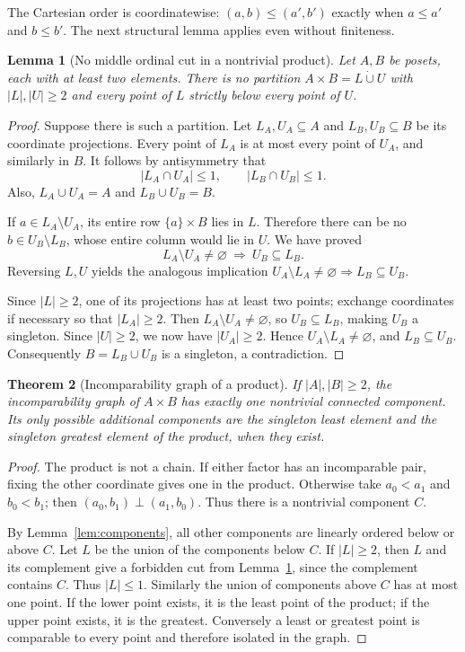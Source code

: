 \documentclass[11pt,a4paper]{article}
\newtheorem{theorem}{Theorem}[section]
\newtheorem{lemma}[theorem]{Lemma}
\theoremstyle{definition}
\theoremstyle{remark}
\begin{document}
The Cartesian order is coordinatewise:
$(a,b)\le(a',b')$ exactly when $a\le a'$ and $b\le b'$.
The next structural lemma applies even without finiteness.

\begin{lemma}[No middle ordinal cut in a nontrivial product]\label{lem:cut}
Let $A,B$ be posets, each with at least two elements. There is no partition
$A\times B=L\mathbin{\dot\cup}U$ with $|L|,|U|\ge2$ and every point of $L$
strictly below every point of $U$.
\end{lemma}

\begin{proof}
Suppose there is such a partition. Let
$L_A,U_A\subseteq A$ and $L_B,U_B\subseteq B$ be its coordinate projections.
Every point of $L_A$ is at most every point of $U_A$, and similarly in $B$.
It follows by antisymmetry that
\[
 |L_A\cap U_A|\le1,\qquad |L_B\cap U_B|\le1.
\]
Also, $L_A\cup U_A=A$ and $L_B\cup U_B=B$.

If $a\in L_A\setminus U_A$, its entire row $\{a\}\times B$ lies in $L$.
Therefore there can be no $b\in U_B\setminus L_B$, whose entire column
would lie in $U$. We have proved
\[
 L_A\setminus U_A\ne\varnothing\ \Longrightarrow\ U_B\subseteq L_B.
\]
Reversing $L,U$ yields the analogous implication
$U_A\setminus L_A\ne\varnothing\Rightarrow L_B\subseteq U_B$.

Since $|L|\ge2$, one of its projections has at least two points; exchange
coordinates if necessary so that $|L_A|\ge2$. Then
$L_A\setminus U_A\ne\varnothing$, so $U_B\subseteq L_B$, making $U_B$ a
singleton. Since $|U|\ge2$, we now have $|U_A|\ge2$. Hence
$U_A\setminus L_A\ne\varnothing$, and $L_B\subseteq U_B$. Consequently
$B=L_B\cup U_B$ is a singleton, a contradiction.
\end{proof}

\begin{theorem}[Incomparability graph of a product]\label{thm:productgraph}
If $|A|,|B|\ge2$, the incomparability graph of $A\times B$ has exactly one
nontrivial connected component. Its only possible additional components
are the singleton least element and the singleton greatest element of the
product, when they exist.
\end{theorem}

\begin{proof}
The product is not a chain. If either factor has an incomparable pair,
fixing the other coordinate gives one in the product. Otherwise take
$a_0<a_1$ and $b_0<b_1$; then $(a_0,b_1)\perp(a_1,b_0)$.
Thus there is a nontrivial component $C$.

By Lemma~\ref{lem:components}, all other components are linearly ordered
below or above $C$. Let $L$ be the union of the components below $C$.
If $|L|\ge2$, then $L$ and its complement give a forbidden cut from
Lemma~\ref{lem:cut}, since the complement contains $C$. Thus $|L|\le1$.
Similarly the union of components above $C$ has at most one point.
If the lower point exists, it is the least point of the product; if the
upper point exists, it is the greatest. Conversely a least or greatest
point is comparable to every point and therefore isolated in the graph.
\end{proof}
\end{document}
